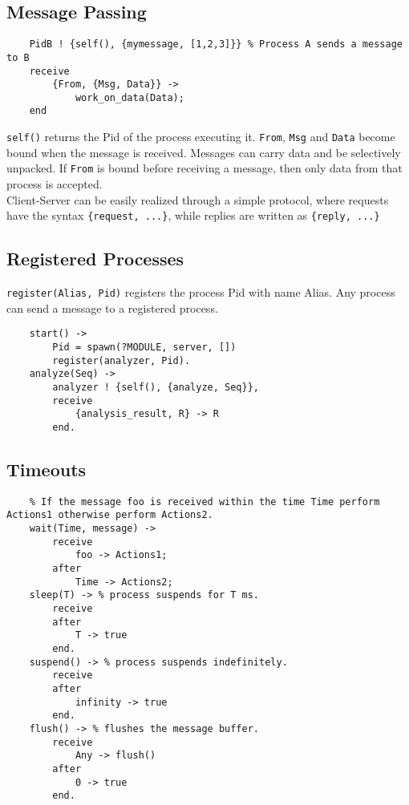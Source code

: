 \subsection{Message Passing}
\begin{lstlisting}
	PidB ! {self(), {mymessage, [1,2,3]}} % Process A sends a message to B
	receive
		{From, {Msg, Data}} ->
			work_on_data(Data);
	end
\end{lstlisting}
\texttt{self()} returns the Pid of the process executing it.
\texttt{From}, \texttt{Msg} and \texttt{Data} become bound when the message is received.
Messages can carry data and be selectively unpacked.
If \texttt{From} is bound before receiving a message, then only data from that process is accepted.\\
Client-Server can be easily realized through a simple protocol, where requests have the syntax \texttt{\{request, ...\}}, while replies are written as \texttt{\{reply, ...\}}

\subsection{Registered Processes}
\texttt{register(Alias, Pid)} registers the process Pid with name Alias.
Any process can send a message to a registered process.
\begin{lstlisting}
	start() ->
		Pid = spawn(?MODULE, server, [])
		register(analyzer, Pid).
	analyze(Seq) ->
		analyzer ! {self(), {analyze, Seq}},
		receive
			{analysis_result, R} -> R
		end.
\end{lstlisting}

\subsection{Timeouts}
\begin{lstlisting}
	% If the message foo is received within the time Time perform Actions1 otherwise perform Actions2.
	wait(Time, message) ->
		receive
			foo -> Actions1;
		after
			Time -> Actions2;
	sleep(T) -> % process suspends for T ms.
		receive
		after
			T -> true
		end.
	suspend() -> % process suspends indefinitely.
		receive
		after
			infinity -> true
		end.
	flush() -> % flushes the message buffer.
		receive
			Any -> flush()
		after
			0 -> true
		end.
\end{lstlisting}